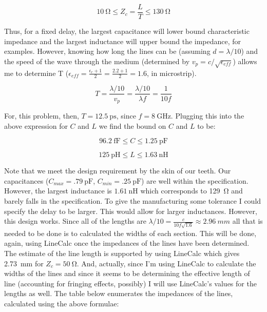     \[ 
        \SI{10}{\ohm} \le Z_c = \frac{L}{T} \le \SI{130}{\ohm}  
    \]

    Thus, for a fixed delay, the largest capacitance will lower bound
    characteristic impedance and the largest inductance will upper bound the
    impedance, for examples. However, knowing how long the lines can be
    (assuming $d = \lambda/10$) and the speed of the wave through the medium
    (determined by $v_p = c / \sqrt{\epsilon_{eff}}$) allows me to determine T ($
    \epsilon_{eff} = \frac{\epsilon_r+1}{2} = \frac{2.2+1}{2} = 1.6$, in
    microstrip).

    \[ 
        T = \frac{\lambda/10}{v_p} = \frac{\lambda/10}{\lambda f} = 
        \frac{1}{10 f}
    \]

    For, this problem, then, $T = \SI{12.5}{\pico\second} $, since $ f =
    \SI{8}{\giga\hertz} $. Plugging this into the above expression for $C$ and
    $L$ we find the bound on $C$ and $L$ to be:

    \[ 
        \SI{96.2}{\femto\farad} \le C \le \SI{1.25}{\pico\farad} 
    \]

    \[ 
        \SI{125}{\pico\henry} \le L \le \SI{1.63}{\nano\henry}  
    \]

    Note that we meet the design requirement by the skin of our teeth. Our
    capacitances ($ C_{max} = \SI{.79}{\pico\farad} $, $ C_{min} =
    \SI{.25}{\pico\farad}  $) are well within the specification. However, the
    largest inductance is $\SI{1.61}{\nano\henry} $ which corresponds to
    \SI{129}{\ohm} and barely falls in the specification. To give the
    manufacturing some tolerance I could specify the delay to be larger. This
    would allow for larger inductances. However, this design works. Since all of
    the lengths are $\lambda/10 = \frac{c}{10 f \sqrt{1.6} } \approx
    \SI{2.96}{mm} $ all that is needed to be done is to calculated the widths of
    each section. This will be done, again, using LineCalc once the impedances
    of the lines have been determined. The estimate of the line length is
    supported by using LineCalc which gives \SI{2.73}{\milli\meter} for $Z_c =
    \SI{50}{\ohm} $. And, actually, since I'm using LineCalc to calculate the
    widths of the lines and since it seems to be determining the effective
    length of line (accounting for fringing effects, possibly) I will use
    LineCalc's values for the lengths as well. The table below enumerates the
    impedances of the lines, calculated using the above formulae:

